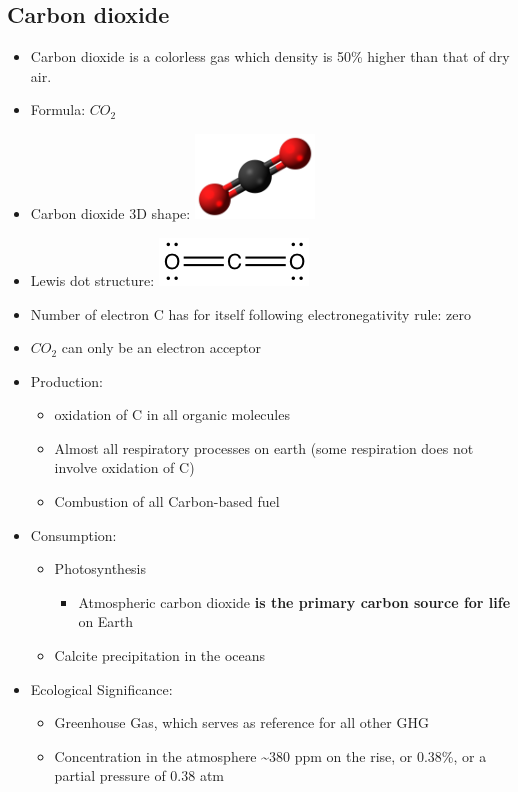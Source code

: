 \documentclass[]{book}
\providecommand{\tightlist}{%
  \setlength{\itemsep}{0pt}\setlength{\parskip}{0pt}}
\theoremstyle{definition}
\theoremstyle{definition}
\theoremstyle{definition}
\theoremstyle{remark}
\begin{document}
\subsection{Carbon dioxide}\label{carbon-dioxide}

\begin{itemize}
\item
  Carbon dioxide is a colorless gas which density is 50\% higher than
  that of dry air.
\item
  Formula: \(CO_2\)
\item
  Carbon dioxide 3D shape:
  \includegraphics[width=0.25000\textwidth]{pictures/Carbon_dioxide_3D_ball.png}
\item
  Lewis dot structure:
  \includegraphics{pictures/CO2_lewis_structure.png}
\item
  Number of electron C has for itself following electronegativity rule:
  zero
\item
  \(CO_2\) can only be an electron acceptor
\item
  Production:

  \begin{itemize}
  \tightlist
  \item
    oxidation of C in all organic molecules
  \item
    Almost all respiratory processes on earth (some respiration does not
    involve oxidation of C)
  \item
    Combustion of all Carbon-based fuel
  \end{itemize}
\item
  Consumption:

  \begin{itemize}
  \tightlist
  \item
    Photosynthesis

    \begin{itemize}
    \tightlist
    \item
      Atmospheric carbon dioxide \textbf{is the primary carbon source
      for life} on Earth
    \end{itemize}
  \item
    Calcite precipitation in the oceans
  \end{itemize}
\item
  Ecological Significance:

  \begin{itemize}
  \tightlist
  \item
    Greenhouse Gas, which serves as reference for all other GHG
  \item
    Concentration in the atmosphere \textasciitilde{}380 ppm on the
    rise, or 0.38\%, or a partial pressure of 0.38 atm
  \end{itemize}
\end{itemize}
\end{document}

